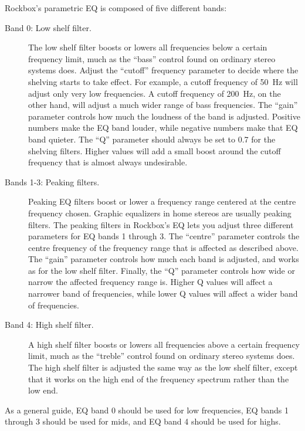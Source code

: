 {  Rockbox's parametric EQ is composed of five different bands:
  \begin{description}
  \item[Band 0: Low shelf filter.]
        The low shelf filter boosts or lowers all frequencies below a certain
        frequency limit, much as the ``bass'' control found on ordinary
        stereo systems does.
        Adjust the ``cutoff'' frequency parameter to decide where the shelving
        starts to take effect. For example, a cutoff frequency of 50~Hz will
        adjust only very low frequencies. A cutoff frequency of 200~Hz, on the
        other hand, will adjust a much wider range of bass frequencies.
        The ``gain'' parameter controls how much the loudness of the band is
        adjusted. Positive numbers make the EQ band louder, while negative
        numbers make that EQ band quieter.
        The ``Q'' parameter should always be set to 0.7 for the shelving
        filters. Higher values will add a small boost around the cutoff
        frequency that is almost always undesirable.
  \item[Bands 1-3: Peaking filters.]
        Peaking EQ filters boost or lower a frequency range centered at the
        centre frequency chosen.
        Graphic equalizers in home stereos are usually peaking
        filters. The peaking filters in Rockbox's EQ lets you adjust three
        different parameters for EQ bands 1 through 3. The ``centre'' parameter
        controls the centre frequency of the frequency range that is affected
        as described above.
        The ``gain'' parameter controls how much each band is adjusted, and
        works as for the low shelf filter.
        Finally, the ``Q'' parameter controls how wide or narrow the affected
        frequency range is. Higher Q values will affect a narrower band of
        frequencies, while lower Q values will affect a wider band of
        frequencies.
  \item[Band 4: High shelf filter.]
        A high shelf filter boosts or lowers all frequencies above a certain
        frequency limit, much as the ``treble'' control found on ordinary
        stereo systems does.
        The high shelf filter is adjusted the same way as the low shelf filter,
        except that it works on the high end of the frequency spectrum rather
        than the low end.
  \end{description}
  As a general guide, EQ band 0 should be used for low frequencies, EQ bands 1
  through 3 should be used for mids, and EQ band 4 should be used for highs.

}
